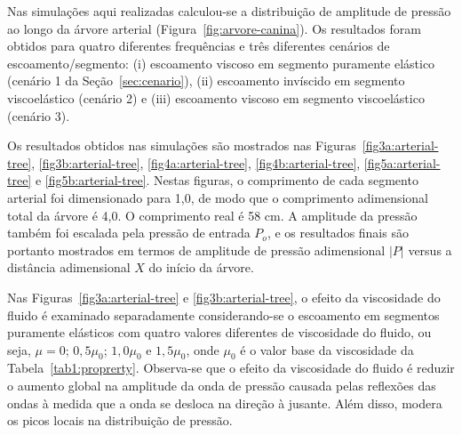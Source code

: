 \documentclass[
        english,			
        brazil			        %
        ,<...>]{abntbibufjf}
\begin{document}
Nas simulações aqui realizadas calculou-se a distribuição de amplitude de pressão ao longo da árvore arterial (Figura~\ref{fig:arvore-canina}). Os resultados foram obtidos para quatro diferentes frequên\-cias e três diferentes cenários de escoamento/segmento: (i) escoamento viscoso em segmento puramente elástico (cenário 1 da Seção~\ref{sec:cenario}), (ii) escoamento invíscido em segmento viscoelástico (cenário 2) e (iii) escoamento viscoso em segmento viscoelástico (cenário 3). 

Os resultados obtidos nas simulações são mostrados nas Figuras~\ref{fig3a:arterial-tree}, \ref{fig3b:arterial-tree}, \ref{fig4a:arterial-tree}, \ref{fig4b:arterial-tree}, \ref{fig5a:arterial-tree} e \ref{fig5b:arterial-tree}. Nestas figuras, o comprimento de cada segmento arterial foi dimensionado para 1,0, de modo que o comprimento adimensional total da árvore é 4,0. O comprimento real é 58 cm. A amplitude da pressão também foi escalada pela pressão de entrada $P_o$, e os resultados finais são portanto mostrados em termos de amplitude de pressão adimensional $|P|$ versus a distância adimensional $X$ do início da árvore.

Nas Figuras~\ref{fig3a:arterial-tree} e \ref{fig3b:arterial-tree}, o efeito da viscosidade do fluido é examinado separadamente conside\-ran\-do-se o escoamento em segmentos puramente elásticos com quatro valores diferentes de viscosidade do fluido, ou seja, $\mu = 0$; $0,5 \mu_0$; $1,0 \mu_0$ e $1,5 \mu_0$, onde $\mu_0$ é o valor base da viscosidade da Tabela~\ref{tab1:proprerty}. Observa-se que o efeito da viscosidade do fluido é reduzir o aumento global na amplitude da onda de pressão causada pelas reflexões das ondas à medida que a onda se desloca na direção à jusante. Além disso, modera os picos locais na distribuição de pressão.
\end{document}
